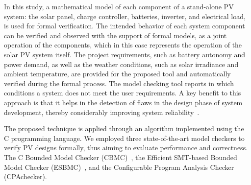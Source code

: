 In this study, a mathematical model of each component of a stand-alone PV system: the solar panel, charge controller, batteries, inverter, and electrical load, is used for formal verification. The intended behavior of each system component can be verified and observed with the support of formal models, as a joint operation of the components, which in this case represents the operation of the solar PV system itself. The project requirements, such as battery autonomy and power demand, as well as the weather conditions, such as solar irradiance and ambient temperature, are provided for the proposed tool and automatically verified during the formal process. The model checking tool reports in which conditions a system does not meet the user requirements. A key benefit to this approach is that it helps in the detection of flaws in the design phase of system development, thereby considerably improving system reliability~\cite{Akram2018}. 

The proposed technique is applied through an algorithm implemented using the C programming language. We employed three state-of-the-art model checkers to verify PV designs formally, thus aiming to evaluate performance and correctness. The C Bounded Model Checker (CBMC)~\cite{Kroening}, the Efficient SMT-based Bounded Model Checker (ESBMC)~\cite{esbmc2018}, and the Configurable Program Analysis Checker (CPAchecker).

